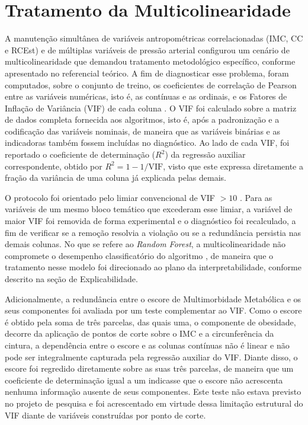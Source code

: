\section{Tratamento da Multicolinearidade}\label{sec:trat-multicolinearidade}

A manutenção simultânea de variáveis antropométricas correlacionadas (IMC, CC e RCEst) e de múltiplas variáveis de pressão arterial configurou um cenário de multicolinearidade que demandou tratamento metodológico específico, conforme apresentado no referencial teórico. A fim de diagnosticar esse problema, foram computados, sobre o conjunto de treino, os coeficientes de correlação de Pearson entre as variáveis numéricas, isto é, as contínuas e as ordinais, e os Fatores de Inflação de Variância (VIF) de cada coluna \cite{Senaviratna2019}. O VIF foi calculado sobre a matriz de dados completa fornecida aos algoritmos, isto é, após a padronização e a codificação das variáveis nominais, de maneira que as variáveis binárias e as indicadoras também fossem incluídas no diagnóstico. Ao lado de cada VIF, foi reportado o coeficiente de determinação ($R^2$) da regressão auxiliar correspondente, obtido por $R^2 = 1 - 1/\text{VIF}$, visto que este expressa diretamente a fração da variância de uma coluna já explicada pelas demais.

O protocolo foi orientado pelo limiar convencional de VIF $> 10$ \cite{Senaviratna2019}. Para as variáveis de um mesmo bloco temático que excederam esse limiar, a variável de maior VIF foi removida de forma experimental e o diagnóstico foi recalculado, a fim de verificar se a remoção resolvia a violação ou se a redundância persistia nas demais colunas. No que se refere ao \textit{Random Forest}, a multicolinearidade não compromete o desempenho classificatório do algoritmo \cite{Chan2022}, de maneira que o tratamento nesse modelo foi direcionado ao plano da interpretabilidade, conforme descrito na seção de Explicabilidade.

Adicionalmente, a redundância entre o escore de Multimorbidade Metabólica e os seus componentes foi avaliada por um teste complementar ao VIF. Como o escore é obtido pela soma de três parcelas, das quais uma, o componente de obesidade, decorre da aplicação de pontos de corte sobre o IMC e a circunferência da cintura, a dependência entre o escore e as colunas contínuas não é linear e não pode ser integralmente capturada pela regressão auxiliar do VIF. Diante disso, o escore foi regredido diretamente sobre as suas três parcelas, de maneira que um coeficiente de determinação igual a um indicasse que o escore não acrescenta nenhuma informação ausente de seus componentes. Este teste não estava previsto no projeto de pesquisa e foi acrescentado em virtude dessa limitação estrutural do VIF diante de variáveis construídas por ponto de corte.

